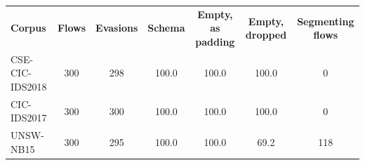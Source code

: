 \begin{tabular}{@{}lcccccc@{}}
\toprule
\textbf{Corpus} & \textbf{Flows} & \textbf{Evasions} & \textbf{Schema} & \textbf{Empty, as padding} & \textbf{Empty, dropped} & \textbf{Segmenting flows} \\
CSE-CIC-IDS2018 & 300 & 298 & 100.0 & 100.0 & 100.0 & 0 \\
CIC-IDS2017 & 300 & 300 & 100.0 & 100.0 & 100.0 & 0 \\
UNSW-NB15 & 300 & 295 & 100.0 & 100.0 & 69.2 & 118 \\
\bottomrule
\end{tabular}
